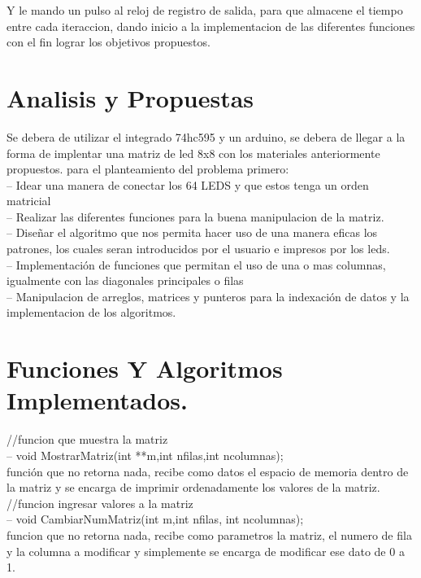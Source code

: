 \documentclass{article}
\begin{document}
Y le mando un pulso al reloj de registro de salida, para que almacene el tiempo entre cada iteraccion, dando inicio a la implementacion de las diferentes funciones con el fin lograr los objetivos propuestos.

\section{Analisis y Propuestas} \label{contenido}

Se debera de utilizar el integrado 74hc595 y un arduino, se debera de llegar a la forma de implentar una matriz de led 8x8 con los materiales anteriormente propuestos. 
para el planteamiento del problema primero:  \\

-- Idear una manera de conectar los 64 LEDS y que estos tenga un orden matricial\\

-- Realizar las diferentes funciones para la buena manipulacion de la matriz.\\

-- Diseñar el algoritmo que nos permita hacer uso de una manera eficas los patrones, los cuales seran introducidos por el usuario e impresos por los leds. \\

-- Implementación de funciones que permitan el uso de una o mas columnas, igualmente con las diagonales principales o filas\\

-- Manipulacion de arreglos, matrices y punteros para la indexación de datos y la implementacion de los algoritmos. \\


\section{Funciones Y Algoritmos Implementados.} \label{contenido}

//funcion que muestra la matriz\\
--  void MostrarMatriz(int **m,int nfilas,int ncolumnas);\\
función que no retorna nada, recibe como datos el espacio de memoria dentro de la matriz y se encarga de imprimir ordenadamente los valores de la matriz. \\

//funcion ingresar valores a la matriz \\
--  void CambiarNumMatriz(int m,int nfilas, int ncolumnas); \\
funcion que no retorna nada, recibe como parametros la matriz, el numero de fila y la columna a modificar y simplemente se encarga de modificar ese dato de 0 a 1. \\
\end{document}
